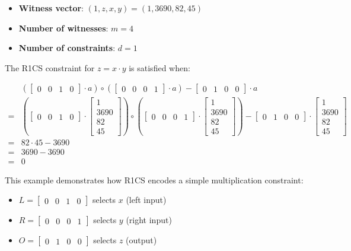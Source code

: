 \documentclass{article}
\begin{document}
\begin{itemize}
    \item \textbf{Witness vector}: $(1, z, x, y) = (1, 3690, 82, 45)$
    \item \textbf{Number of witnesses}: $m = 4$
    \item \textbf{Number of constraints}: $d = 1$
\end{itemize}

The R1CS constraint for $z = x \cdot y$ is satisfied when:

\begin{align*}
&(\begin{bmatrix} 0 & 0 & 1 & 0 \end{bmatrix} \cdot a) \circ (\begin{bmatrix} 0 & 0 & 0 & 1 \end{bmatrix} \cdot a) - \begin{bmatrix} 0 & 1 & 0 & 0 \end{bmatrix} \cdot a \\
=&(\begin{bmatrix} 0 & 0 & 1 & 0 \end{bmatrix} \cdot \begin{bmatrix}
1 \\ 3690 \\ 82 \\ 45
\end{bmatrix}) \circ (\begin{bmatrix} 0 & 0 & 0 & 1 \end{bmatrix} \cdot \begin{bmatrix}
1 \\ 3690 \\ 82 \\ 45
\end{bmatrix}) - \begin{bmatrix} 0 & 1 & 0 & 0 \end{bmatrix} \cdot \begin{bmatrix}
1 \\ 3690 \\ 82 \\ 45
\end{bmatrix} \\
=& 82 \cdot 45 - 3690 \\
=& 3690 - 3690 \\
=& 0
\end{align*}

This example demonstrates how R1CS encodes a simple multiplication constraint:
\begin{itemize}
\item $L = \begin{bmatrix} 0 & 0 & 1 & 0 \end{bmatrix}$ selects $x$ (left input)
\item $R = \begin{bmatrix} 0 & 0 & 0 & 1 \end{bmatrix}$ selects $y$ (right input)
\item $O = \begin{bmatrix} 0 & 1 & 0 & 0 \end{bmatrix}$ selects $z$ (output)
\end{itemize}
\end{document}
